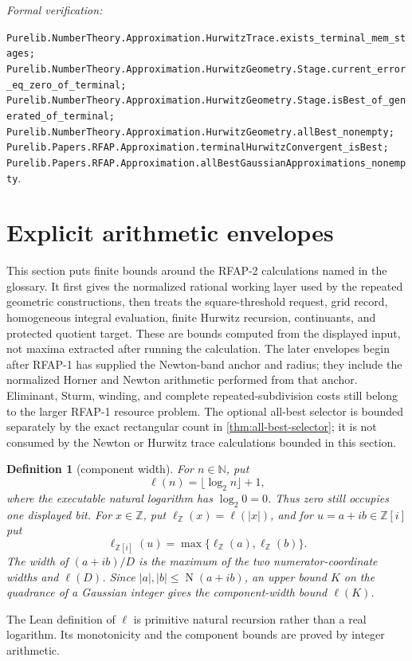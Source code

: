 \documentclass[11pt]{article}
\newtheorem{definition}[definition]{Definition}
\newcommand{\Zi}{\mathbb{Z}[i]}
\newcommand{\N}{\mathbb{N}}
\newcommand{\Z}{\mathbb{Z}}
\newcommand{\Norm}[1]{\operatorname{N}\!\left(#1\right)}
\newcommand{\leanref}[1]{\par\smallskip\noindent
  \emph{Formal verification:}\par\nobreak
  {\raggedright\nolinkurl{#1}.\par}}
\begin{document}
\leanref{Purelib.NumberTheory.Approximation.HurwitzTrace.exists_terminal_mem_stages;
Purelib.NumberTheory.Approximation.HurwitzGeometry.Stage.current_error_eq_zero_of_terminal;
Purelib.NumberTheory.Approximation.HurwitzGeometry.Stage.isBest_of_generated_of_terminal;
Purelib.NumberTheory.Approximation.HurwitzGeometry.allBest_nonempty;
Purelib.Papers.RFAP.Approximation.terminalHurwitzConvergent_isBest;
Purelib.Papers.RFAP.Approximation.allBestGaussianApproximations_nonempty}

\section{Explicit arithmetic envelopes}
\label{sec:arithmetic-envelopes}

This section puts finite bounds around the RFAP-2 calculations named in the
glossary.  It first gives the normalized rational working layer used by the
repeated geometric constructions, then treats the square-threshold request,
grid record, homogeneous integral evaluation, finite Hurwitz recursion,
continuants, and protected quotient target.  These are bounds computed from
the displayed input, not maxima extracted after running the calculation.
The later envelopes begin after RFAP-1 has supplied the Newton-band anchor and
radius; they include the normalized Horner and Newton arithmetic performed
from that anchor.  Eliminant, Sturm, winding, and complete
repeated-subdivision costs still belong to the larger RFAP-1 resource problem.
The optional all-best selector is bounded separately by the exact rectangular
count in \cref{thm:all-best-selector}; it is not consumed by the Newton or
Hurwitz trace calculations bounded in this section.

\begin{definition}[component width]
\label{def:component-width}
For $n\in\N$, put
\[
                 \ell(n)=\lfloor\log_2n\rfloor+1,
\]
where the executable natural logarithm has $\log_2 0=0$.  Thus zero still
occupies one displayed bit.  For $x\in\Z$, put
$\ell_{\Z}(x)=\ell(|x|)$, and for $u=a+ib\in\Zi$ put
\[
                 \ell_{\Zi}(u)=\max\{\ell_{\Z}(a),\ell_{\Z}(b)\}.
\]
The width of $(a+ib)/D$ is the maximum of the two numerator-coordinate widths
and $\ell(D)$.  Since $|a|,|b|\le\Norm{a+ib}$, an upper bound $K$ on the
quadrance of a Gaussian integer gives the component-width bound $\ell(K)$.
\end{definition}

The Lean definition of $\ell$ is primitive natural recursion rather than a
real logarithm.  Its monotonicity and the component bounds are proved by
integer arithmetic.
\end{document}

